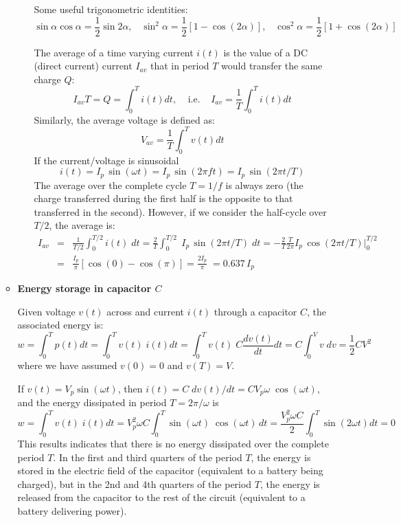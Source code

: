 \begin{itemize}
\begin{itemize}
\begin{itemize}

      Some useful trigonometric identities:
      \[ 
      \sin\alpha \cos\alpha=\frac{1}{2} \sin{2\alpha},\;\;\;
      \sin^2\alpha =\frac{1}{2}[1-\cos(2\alpha)],\;\;\;
      \cos^2\alpha =\frac{1}{2}[1+\cos(2\alpha)] 
      \]

      The average of a time varying current $i(t)$ is the value of
      a DC (direct current) current $I_{av}$ that in period $T$ would 
      transfer the same charge $Q$:
      \[	
      I_{av}T=Q=\int_0^T i(t) dt,\;\;\;\;\mbox{i.e.}\;\;\;\;
      I_{av}=\frac{1}{T}\int_0^T i(t) dt	
      \]
      Similarly, the average voltage is defined as:
      \[
      V_{av}=\frac{1}{T}\int_0^T v(t) dt	
      \]
      If the current/voltage is sinusoidal
      \[
      i(t)=I_p\,\sin(\omega t)=I_p\,\sin(2\pi ft)=I_p\,\sin(2\pi t/T)
      \]
      The average over the complete cycle $T=1/f$ is always zero (the 
      charge transferred during the first half is the opposite to that 
      transferred in the second). However, if we consider the half-cycle 
      over $T/2$, the average is:
      \begin{eqnarray} 
        I_{av}&=&\frac{1}{T/2}\int_0^{T/2} i(t)\; dt
        =\frac{2}{T}\int_0^{T/2} \;I_p\,\sin(2\pi t/T)\;dt	
        =-\frac{2}{T}\frac{T}{2\pi} I_p\,\cos(2\pi t/T)\bigg|_0^{T/2}
        \nonumber \\
        &=& \frac{I_p}{\pi}\left[\cos(0)-\cos(\pi)\right]
        =\frac{2I_p}{\pi}\;=0.637\,I_p
        \nonumber
      \end{eqnarray}

  \end{itemize}

\item {\bf Energy storage in capacitor $C$}

  Given voltage $v(t)$ across and current $i(t)$ through a capacitor $C$,
  the associated energy is:
  \[	
  w=\int_0^T p(t)dt=\int_0^T v(t)\; i(t) dt
  =\int_0^T v(t) \;C\frac{dv(t)}{dt} dt
  =C \int_0^V v\;dv=\frac{1}{2}CV^2
  \]
  where we have assumed $v(0)=0$ and $v(T)=V$. 

  If $v(t)=V_p \sin(\omega t)$, then
  $i(t)=C\;dv(t)/dt=C V_p\omega\;\cos(\omega t)$, and the energy dissipated
  in period $T=2\pi/\omega$ is
  \[ 
  w= \int_0^T v(t)\; i(t) dt
  =V_p^2\omega C\int_0^T \sin(\omega t)\;\cos(\omega t)\,dt
  =\frac{V_p^2\omega C}{2} \int_0^T \sin(2\omega t) dt=0 
  \]
  This results indicates that there is no energy dissipated over the complete 
  period $T$. In the first and third quarters of the period $T$, the energy
  is stored in the electric field of the capacitor (equivalent to a battery 
  being charged), but in the 2nd and 4th quarters of the period $T$, the energy
  is released from the capacitor to the rest of the circuit (equivalent to a 
  battery delivering power).
  

\end{itemize}
\end{itemize}
